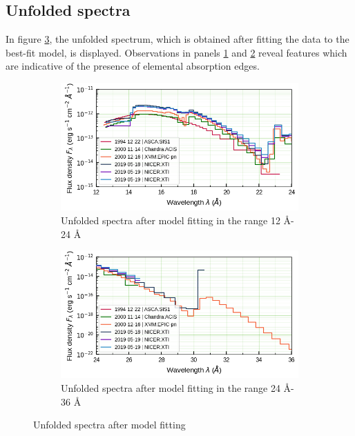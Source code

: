     \subsection{Unfolded spectra}
    In figure \ref{fig:all-uf}, the unfolded spectrum, which is obtained after fitting the data to the best-fit model, is displayed. Observations in panels \ref{fig:all-uf:12-24} and \ref{fig:all-uf:24-36} reveal features which are indicative of the presence of elemental absorption edges.
    
    \begin{figure}[!bht]
        \centering
        \begin{subfigure}[b]{0.45\textwidth}
            \includegraphics[width=\textwidth]{figures/eufspec/mr-vel-uf_all-obs_12-24.png}
            \caption{Unfolded spectra after model fitting in the range 12 \AA - 24 \AA}
            \label{fig:all-uf:12-24}
        \end{subfigure}
        \hfill
        \begin{subfigure}[b]{0.45\textwidth}
            \includegraphics[width=\textwidth]{figures/eufspec/mr-vel-uf_all-obs_24-36.png}
            \caption{Unfolded spectra after model fitting in the range 24 \AA - 36 \AA}
            \label{fig:all-uf:24-36}
        \end{subfigure}
        \caption{Unfolded spectra after model fitting}
        \label{fig:all-uf}
    \end{figure}
    
